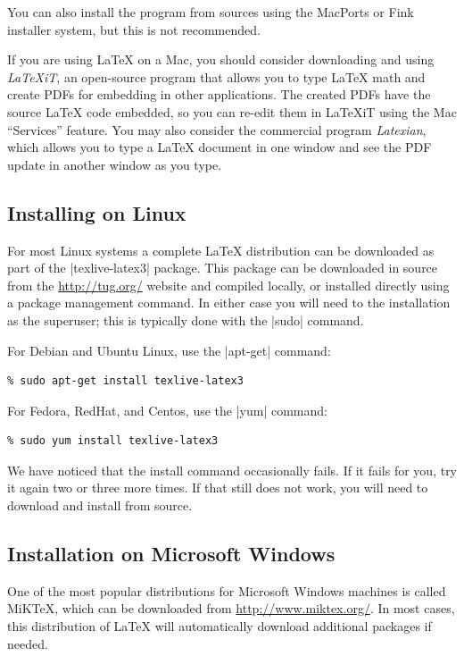 You can also install the program from sources using the MacPorts or Fink installer system, but this is not recommended. 

If you are using \LaTeX{} on a Mac, you should consider downloading
and using \emph{LaTeXiT}, an open-source program that allows you to type
\LaTeX{} math and create PDFs for embedding in other applications. The
created PDFs have the source \LaTeX{} code embedded, so you can re-edit
them in LaTeXiT using the Mac ``Services'' feature.  You may also consider the
commercial program \emph{Latexian}, which allows you to type a
\LaTeX{} document in one window
and see the PDF update in another window as you type.

\subsection{Installing on Linux}
For most Linux systems a complete \LaTeX{} distribution 
can be downloaded as part of the |texlive-latex3| package. This
package can be downloaded in source from the \url{http://tug.org/}
website and compiled locally, or installed directly using a package
management command. In either case you will need to the installation
as the superuser; this is typically done with the |sudo| command.

For Debian and Ubuntu Linux, use the |apt-get| command:

\begin{Verbatim}
% sudo apt-get install texlive-latex3
\end{Verbatim}

For Fedora, RedHat, and Centos, use the |yum| command:

\begin{Verbatim}
% sudo yum install texlive-latex3
\end{Verbatim}

We have noticed that the install command occasionally fails. If it
fails for you, try it again two or three more times. If that still does not work, you will need to download and
install from source.

\subsection{Installation on Microsoft Windows}
One of the most popular distributions for Microsoft Windows machines is called
MiK\TeX, which can be downloaded from \url{http://www.miktex.org/}.
In most cases, this distribution of \LaTeX{} will automatically
download additional packages if needed.

